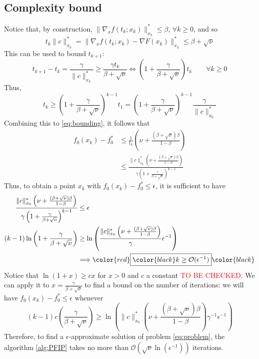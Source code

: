 \documentclass[12pt, openany]{report}
\theoremstyle{definition}
\begin{document}
\subsection{Complexity bound}
Notice that, by construction, $\|\nabla_xf(t_k;x_k)\|_{x_k}^*\le \beta$, $\forall k\ge 0$, and so 
\begin{equation}
	t_k \|c\|_{x_k}^* = \|\nabla_x f(t_k;x_k)-\nabla F(x_k)\|_{x_k}^* \le \beta +\sqrt{\nu}
\end{equation}
This can be used to bound $t_{k+1}$: 
\begin{equation}
	t_{k+1}-t_k = \frac{\gamma}{\|c\|_{x_k}^*}\ge \frac{\gamma t_k}{\beta+\sqrt{\nu}} \Longleftrightarrow \left(1+\frac{\gamma}{\beta+\sqrt{\nu}}\right)t_k \qquad \forall k\ge 0
\end{equation}
Thus,
\begin{equation}\label{eq:t_k}
	t_k \ge \left(1+\frac{\gamma}{\beta+\sqrt{\nu}}\right)^{k-1}t_1 = \left(1+\frac{\gamma}{\beta+\sqrt{\nu}}\right)^{k-1} \frac{\gamma}{\|c\|_{x_0}^*}
\end{equation}
Combining this to \eqref{eq:bounding}, it follows that 
\begin{equation}
	\begin{aligned}
		f_0(x_k)-f_0^* &\le \frac{1}{t_k}\left(\nu+\frac{(\beta+\sqrt{\nu})\beta}{1-\beta}\right)\\
		& \le \frac{\|c\|_{x_0}^* \left(\nu +\frac{(\beta+\sqrt{\nu})\beta}{1-\beta}\right)}{\gamma \left(1+\frac{\gamma}{\beta+\sqrt{\nu}}\right)^{k-1}}
	\end{aligned}
\end{equation}
Thus, to obtain a point $x_k$ with $f_0(x_k)-f_0^* \le \epsilon$, it is sufficient to have 
\begin{equation}
	\begin{aligned}
		\frac{\|c\|_{x_0}^*\left(\nu + \frac{(\beta+\sqrt{\nu})\beta}{1-\beta}\right)}{\gamma\left(1+\frac{\gamma}{\beta+\sqrt{\nu}}\right)^{k-1}}&\le \epsilon \\
		(k-1) \ln\left(1+\frac{\gamma}{\beta+\sqrt{\nu}}\right) &\ge \ln \left(\frac{\|c\|_{x_0}^* \left(\nu +\frac{(\beta+\sqrt{\nu})\beta}{1-\beta}\right)}{\gamma}\epsilon^{-1}\right)\\
		&\Longrightarrow \color{red}\boxed{\color{black}k \ge \mathcal{O}(\epsilon^{-1})}\color{black}
	\end{aligned}
\end{equation}
Notice that $\ln(1+x)\ge cx$ for $x>0$ and $c$ a constant \textcolor{red}{TO BE CHECKED}. We can apply it to $x=\frac{\gamma}{\beta+\sqrt{\nu}}$ to find a bound on the number of iterations: we will have $f_0(x_k)-f_0^* \le \epsilon$ whenever
\begin{equation}
	(k-1)c\left(\frac{\gamma}{\beta+\sqrt{\nu}}\right)\ge \ln \left(\|c\|_{x_0}^* \left(\nu + \frac{(\beta+\sqrt{\nu})\beta}{1-\beta}\right)\gamma^{-1} \epsilon^{-1}\right)
\end{equation}
Therefore, to find a $\epsilon$-approximate solution of problem \eqref{eq:problem}, the algorithm \ref{alg:PFIP} takes no more than $\mathcal{O}(\sqrt{\nu}\ln(\epsilon^{-1}))$ iterations.
\end{document}
